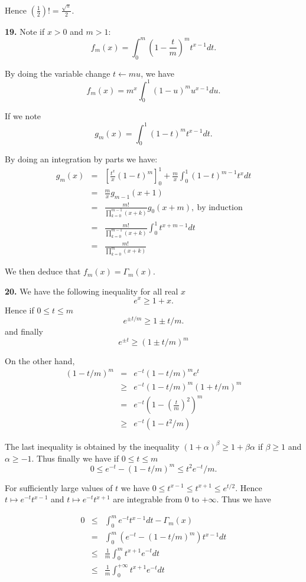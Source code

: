 \documentclass[a4paper,12pt]{article}
\newcommand{\newpar}[1]{\bigskip \noindent \textbf{#1.}}
\newcommand{\la}{\leftarrow}
\begin{document}
Hence $\left(\frac{1}{2}\right)! = \frac{\sqrt{\pi}}{2}$.

\newpar{19} Note if $x>0$ and $m>1$:
\[ f_m(x) = \int_0^m \left( 1 - \frac{t}{m} \right)^m t^{x-1} dt.\]

By doing the variable change $t \la mu$, we have
\[ f_m(x) = m^x\int_0^1 (1 - u)^m  u^{x-1} du.\]

If we note
\[g_m(x) = \int_0^1 (1 - t)^m  t^{x-1} dt.\]

By doing an integration by parts we have:
\begin{eqnarray*}
  g_m(x) &=& \left[ \frac{t^x}{x} (1-t)^m
    \right]_0^1 + \frac{m}{x} \int_0^1 (1-t)^{m-1} t^x dt \\
  &=& \frac{m}{x} g_{m-1}(x+1) \\
  &=& \frac{m!}{\prod_{k=0}^{m-1} (x+k)}g_0(x+m),\ \mbox{by
    induction}\\
  &=& \frac{m!}{\prod_{k=0}^{m-1}(x+k)} \int_0^1 t^{x+m-1}dt\\
  &=& \frac{m!}{\prod_{k=0}^m(x+k)}
\end{eqnarray*}

We then deduce that $f_m(x) = \Gamma_m(x).$

\newpar{20} We have the following inequality for all real $x$
\[ e^x \ge 1+x.\]
Hence if $0\le t \le m$ \[ e^{\pm t/m} \ge 1 \pm t/m.\]
and finally \[ e^{\pm t} \ge (1 \pm t/m)^m\]

On the other hand,
\begin{eqnarray*}
  (1 - t/m)^m &=& e^{-t} (1-t/m)^m e^t \\
  &\ge& e^{-t} (1-t/m)^m (1+t/m)^m \\
  &=& e^{-t} \left(1-\left(\frac{t}{m}\right)^2\right)^m \\
  &\ge& e^{-t} (1 - t^2/m)
\end{eqnarray*}

The last inequality is obtained by the inequality $(1+\alpha)^\beta
\ge 1 + \beta\alpha$ if $\beta \ge 1$ and $\alpha \ge -1$.  Thus
finally we have if $0\le t\le m$
\[ 0 \le e^{-t} - (1-t/m)^m \le t^2e^{-t}/m.\]

For sufficiently large values of $t$ we have $0 \le t^{x-1} \le
t^{x+1} \le e^{t/2}$.  Hence $t \mapsto e^{-t}t^{x-1}$ and $t\mapsto
e^{-t}t^{x+1}$ are integrable from $0$ to $+\infty$. Thus we have

\begin{eqnarray*}
  0 &\le& \int_0^m e^{-t} t^{x-1} dt - \Gamma_m(x) \\
  &=& \int_0^m (e^{-t} - (1-t/m)^m) t^{x-1} dt \\
  &\le& \frac{1}{m} \int_0^m t^{x+1} e^{-t} dt \\
  &\le& \frac{1}{m} \int_0^{+\infty} t^{x+1}e^{-t} dt
\end{eqnarray*}
\end{document}
